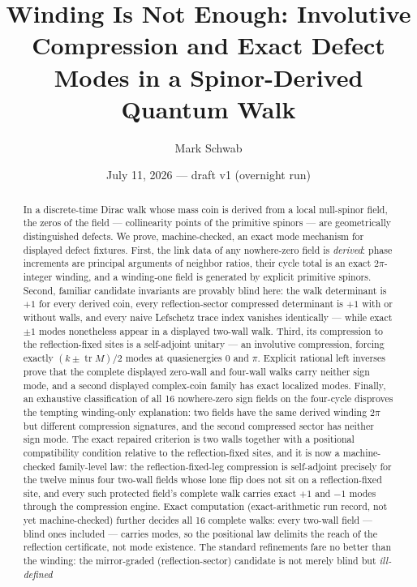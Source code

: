 \documentclass[11pt]{article}
\title{Winding Is Not Enough: Involutive Compression and Exact Defect
Modes in a Spinor-Derived Quantum Walk}
\author{Mark Schwab}
\date{July 11, 2026 --- draft v1 (overnight run)}
\newcommand{\tr}{\operatorname{tr}}
\begin{document}
\maketitle

\begin{abstract}
In a discrete-time Dirac walk whose mass coin is derived from a local
null-spinor field, the zeros of the field --- collinearity points of the
primitive spinors --- are geometrically distinguished defects.  We prove,
machine-checked, an exact mode mechanism for displayed defect fixtures.
First, the link data of any nowhere-zero field is \emph{derived}: phase
increments are principal arguments of neighbor ratios, their cycle total is
an exact $2\pi$-integer winding, and a winding-one field is generated by
explicit primitive spinors.  Second, familiar candidate invariants are
provably blind here: the walk determinant is $+1$ for every derived coin,
every reflection-sector compressed determinant is $+1$ with or without
walls, and every naive Lefschetz trace index vanishes identically ---
while exact $\pm1$ modes nonetheless appear in a displayed two-wall walk.
Third, its compression to the reflection-fixed sites is a self-adjoint
unitary --- an involutive compression, forcing exactly
$(k\pm\tr M)/2$ modes at quasienergies $0$ and $\pi$.  Explicit rational
left inverses prove that the complete displayed zero-wall and four-wall
walks carry neither sign mode, and a second displayed complex-coin family
has exact localized modes.  Finally, an exhaustive classification of all
16 nowhere-zero sign fields on the four-cycle disproves the tempting
winding-only explanation: two fields have the same derived winding $2\pi$
but different compression signatures, and the second compressed sector has
neither sign mode.  The exact repaired criterion is two walls together with
a positional compatibility condition relative to the reflection-fixed
sites, and it is now a machine-checked family-level law: the
reflection-fixed-leg compression is self-adjoint precisely for the twelve
minus four two-wall fields whose lone flip does not sit on a
reflection-fixed site, and every such protected field's complete walk
carries exact $+1$ and $-1$ modes through the compression engine.  Exact
computation (exact-arithmetic run record, not yet machine-checked)
further decides all 16 complete walks: every two-wall field
--- blind ones included --- carries modes, so the positional law
delimits the reach of the reflection certificate, not mode existence.
The standard refinements fare no better than the winding: the mirror-graded
(reflection-sector) candidate is not merely blind but \emph{ill-defined}

\end{abstract}
\end{document}
